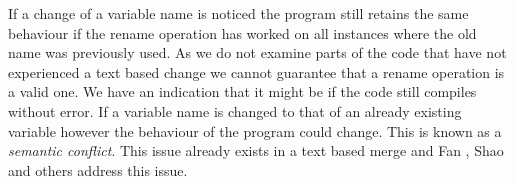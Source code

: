 If a change of a variable name is noticed the program still retains the same behaviour if the rename operation has worked on all instances where the old name was previously used.  As we do not examine parts of the code that have not experienced a text based change we cannot guarantee that a rename operation is a valid one. We have an indication that it might be if the code still compiles without error. If a variable name is changed to that of an already existing variable however the behaviour of the program could change. This is known as a \emph{semantic conflict}.  This issue already exists in a text based merge and Fan \cite{Fan2012}, Shao \cite{Shao2009} and others address this issue. 
